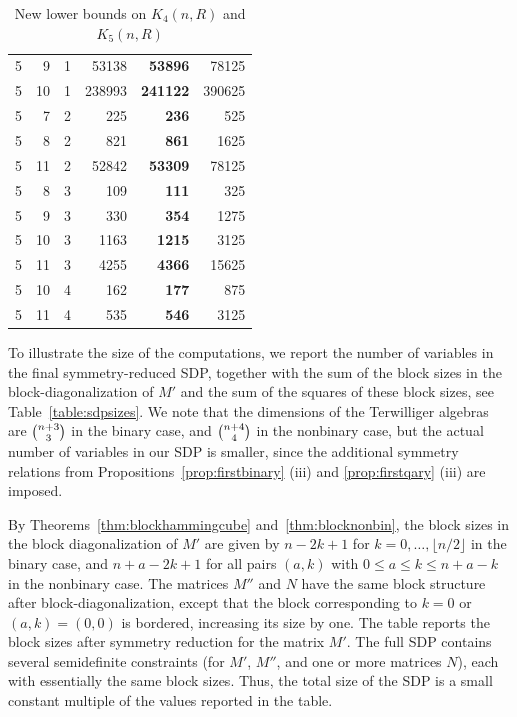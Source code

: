 \documentclass[10pt,a4paper]{article}
\theoremstyle{definition}
\begin{document}
\begin{table}[H]
\begin{center}
\begin{minipage}[t]{.47\linewidth}
\begin{tabular}{| r |r | r|| r |>{\bfseries}r | r|}
    5 &  9 & 1  & 53138 & 53896&  78125 \\    
    5 &  10 & 1  & 238993 &241122 & 390625  \\  \hline  
    5 &  7 & 2  & 225 &236 & 525  \\          
    5 &  8 & 2  & 821 &861 & 1625  \\    
    5 &  11 & 2   & 52842 & 53309& 78125  \\  \hline        
    5 &  8  & 3  & 109 & 111& 325  \\    
    5 & 9  & 3  & 330 & 354&  1275  \\          
    5 & 10  & 3  & 1163 & 1215& 3125  \\    
    5 &  11 & 3  & 4255 & 4366& 15625  \\ \hline 
    5 &  10 &  4 &  162& 177&  875 \\    
    5 &  11 &  4 &  535& 546& 3125  \\ \hline    
    \end{tabular}\end{minipage}     
\end{center}
  \caption{New lower bounds on $K_4(n,R)$ and $K_5(n,R)$}
\end{table} 


To illustrate the size of the computations, we report the number of variables in the final symmetry-reduced SDP, together with the sum of the block sizes in the block-diagonalization of $M'$ and the sum of the squares of these block sizes, see Table~\ref{table:sdpsizes}. We note that the dimensions of the Terwilliger algebras are $\tbinom{n+3}{3}$ in the binary case, and $\tbinom{n+4}{4}$ in the nonbinary case, but the actual number of variables in our SDP is smaller, since the additional symmetry relations from Propositions~\ref{prop:firstbinary} (iii) and \ref{prop:firstqary} (iii) are imposed.

By Theorems~\ref{thm:blockhammingcube} and~\ref{thm:blocknonbin}, the block sizes in the block diagonalization of $M'$ are given by $n-2k+1$ for $k=0,\ldots,\lfloor n/2 \rfloor$ in the binary case, and $n+a-2k+1$ for all pairs $(a,k)$ with $0 \le a \le k \le  n+a-k $ in the nonbinary case. 
The matrices $M''$ and $N$ have the same block structure after block-diagonalization, except that the block corresponding to $k=0$ or $(a,k)=(0,0)$ is bordered, increasing its size by one. The table reports the block sizes after symmetry reduction for the matrix $M'$. The full SDP contains several semidefinite constraints (for $M'$, $M''$, and one or more matrices $N$), each with essentially the same block sizes. Thus, the total size of the SDP is a small constant multiple of the values reported in the table.
\end{document}
